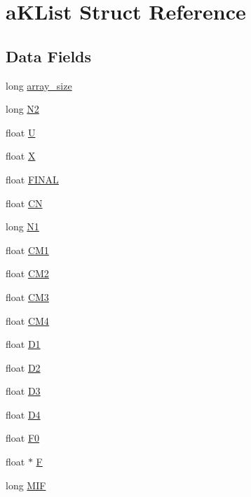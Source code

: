 \hypertarget{structaKList}{
\section{aKList Struct Reference}
\label{d8/d05/structaKList}
}
\subsection*{Data Fields}
\begin{CompactItemize}
\item 
long \hyperlink{structaKList_b20285368c240a1f4943c57b3e8105b1}{array\_\-size}
\item 
long \hyperlink{structaKList_eb032f9fbd7c2bcfb5dd8aa39ab5d9ca}{N2}
\item 
float \hyperlink{structaKList_f2b99409b52c2dc9d8b02fc56da43cfc}{U}
\item 
float \hyperlink{structaKList_19fc2ddf4681376b993415651c9372a3}{X}
\item 
float \hyperlink{structaKList_66f7d2757439f53392f0f09558b5ca8a}{FINAL}
\item 
float \hyperlink{structaKList_ad305c1a736325b5913e74c88d024a64}{CN}
\item 
long \hyperlink{structaKList_17c07250db10e89670ab0599183712e3}{N1}
\item 
float \hyperlink{structaKList_f383ae76f33475a6addcbc9f2502cbfa}{CM1}
\item 
float \hyperlink{structaKList_b44933c2ae3026bdf845082db23d3788}{CM2}
\item 
float \hyperlink{structaKList_6b74a4853c5e8ec36e0ea09b750fa0ff}{CM3}
\item 
float \hyperlink{structaKList_7fd06f954c0475bc6be8f7d8609c663a}{CM4}
\item 
float \hyperlink{structaKList_c2f18df756daf04e20abd8165ac43ecc}{D1}
\item 
float \hyperlink{structaKList_cc7b2d902c10c27fafc7e4ada411cca5}{D2}
\item 
float \hyperlink{structaKList_fa209deff3456d0f63621f8bca5d03e5}{D3}
\item 
float \hyperlink{structaKList_0b867a3be7fb150ff7a4707ff23f5e82}{D4}
\item 
float \hyperlink{structaKList_30dcac3a8d0d857f0a42381aa91a15af}{F0}
\item 
float $\ast$ \hyperlink{structaKList_e21d5c02650e5f334bfffcfeb3953787}{F}
\item 
long \hyperlink{structaKList_72100920c4eaab09e10bc54a76beedda}{MIF}

\end{CompactItemize}

